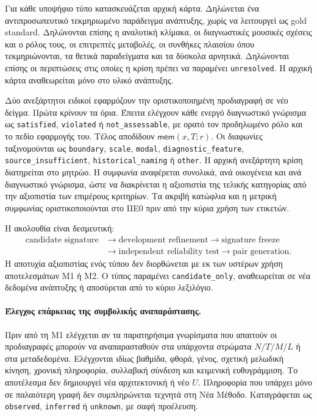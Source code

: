 \documentclass[11pt,a4paper]{article}
\begin{document}
Για κάθε υποψήφιο τύπο κατασκευάζεται αρχική κάρτα. Δηλώνεται ένα αντιπροσωπευτικό τεκμηριωμένο παράδειγμα ανάπτυξης, χωρίς να λειτουργεί ως gold standard. Δηλώνονται επίσης η αναλυτική κλίμακα, οι διαγνωστικές μουσικές σχέσεις και ο ρόλος τους, οι επιτρεπτές μεταβολές, οι συνθήκες πλαισίου όπου τεκμηριώνονται, τα θετικά παραδείγματα και τα δύσκολα αρνητικά. Δηλώνονται επίσης οι περιπτώσεις στις οποίες η κρίση πρέπει να παραμένει \texttt{unresolved}. Η αρχική κάρτα αναθεωρείται μόνο στο υλικό ανάπτυξης.

Δύο ανεξάρτητοι ειδικοί εφαρμόζουν την οριστικοποιημένη προδιαγραφή σε νέο δείγμα. Πρώτα κρίνουν τα όρια. Έπειτα ελέγχουν κάθε ενεργό διαγνωστικό γνώρισμα ως \texttt{satisfied}, \texttt{violated} ή \texttt{not\_assessable}, με ορατό τον προδηλωμένο ρόλο και το πεδίο εφαρμογής του. Τέλος αποδίδουν $\mathsf{mem}(x,T;r)$. Οι διαφωνίες ταξινομούνται ως \texttt{boundary}, \texttt{scale}, \texttt{modal}, \texttt{diagnostic\_feature}, \texttt{source\_insufficient}, \texttt{historical\_naming} ή \texttt{other}. Η αρχική ανεξάρτητη κρίση διατηρείται στο μητρώο. Η συμφωνία αναφέρεται συνολικά, ανά οικογένεια και ανά διαγνωστικό γνώρισμα, ώστε να διακρίνεται η αξιοπιστία της τελικής κατηγορίας από την αξιοπιστία των επιμέρους κριτηρίων. Τα ακριβή κατώφλια και η μετρική συμφωνίας οριστικοποιούνται στο ΠΕ0 πριν από την κύρια χρήση των ετικετών.

Η ακολουθία είναι δεσμευτική:
\[
\begin{aligned}
\text{candidate signature} &\rightarrow \text{development refinement}
\rightarrow \text{signature freeze}\\
&\rightarrow \text{independent reliability test}
\rightarrow \text{pair generation}.
\end{aligned}
\]
Η αποτυχία αξιοπιστίας ενός τύπου δεν διορθώνεται με εκ των υστέρων χρήση αποτελεσμάτων M1 ή M2. Ο τύπος παραμένει \texttt{candidate\_only}, αναθεωρείται σε νέα δεδομένα ανάπτυξης ή αποσύρεται από το κύριο λεξιλόγιο.

\paragraph{Έλεγχος επάρκειας της συμβολικής αναπαράστασης.}
Πριν από τη M1 ελέγχεται αν τα παρατηρήσιμα γνωρίσματα που απαιτούν οι προδιαγραφές μπορούν να αναπαρασταθούν στα υπάρχοντα στρώματα $N/T/M/L$ ή στα μεταδεδομένα. Ελέγχονται ιδίως βαθμίδα, φθορά, γένος, σχετική μελωδική κίνηση, χρονική πληροφορία, συλλαβική σύνδεση και κειμενική ευθυγράμμιση. Το αποτέλεσμα δεν δημιουργεί νέα αρχιτεκτονική ή νέο $U$. Πληροφορία που υπάρχει μόνο σε παλαιότερη γραφή δεν συμπληρώνεται τεχνητά στη Νέα Μέθοδο. Καταγράφεται ως \texttt{observed}, \texttt{inferred} ή \texttt{unknown}, με σαφή προέλευση.
\end{document}
